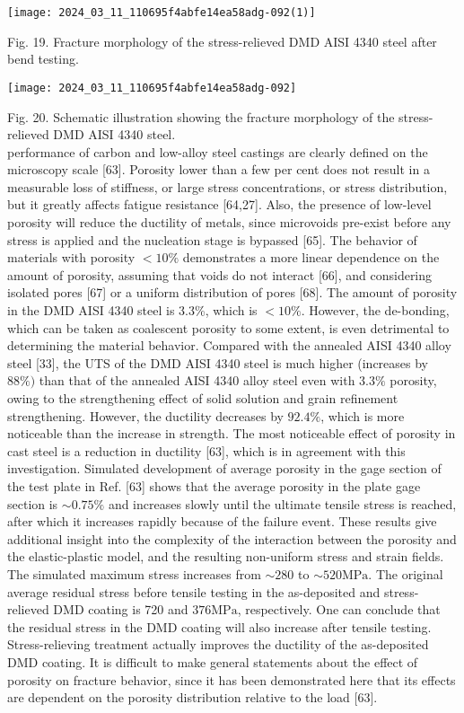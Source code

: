 \documentclass[10pt]{article}
\begin{document}
\begin{center}
\texttt{[image: 2024\_03\_11\_110695f4abfe14ea58adg-092(1)]}
\end{center}

Fig. 19. Fracture morphology of the stress-relieved DMD AISI 4340 steel after bend testing.

\begin{center}
\texttt{[image: 2024\_03\_11\_110695f4abfe14ea58adg-092]}
\end{center}

Fig. 20. Schematic illustration showing the fracture morphology of the stress-relieved DMD AISI 4340 steel.\\
performance of carbon and low-alloy steel castings are clearly defined on the microscopy scale [63]. Porosity lower than a few per cent does not result in a measurable loss of stiffness, or large stress concentrations, or stress distribution, but it greatly affects fatigue resistance [64,27]. Also, the presence of low-level porosity will reduce the ductility of metals, since microvoids pre-exist before any stress is applied and the nucleation stage is bypassed [65]. The behavior of materials with porosity $<10 \%$ demonstrates a more linear dependence on the amount of porosity, assuming that voids do not interact [66], and considering isolated pores [67] or a uniform distribution of pores [68]. The amount of porosity in the DMD AISI 4340 steel is 3.3\%, which is $<10 \%$. However, the de-bonding, which can be taken as coalescent porosity to some extent, is even detrimental to determining the material behavior. Compared with the annealed AISI 4340 alloy steel [33], the UTS of the DMD AISI 4340 steel is much higher (increases by $88 \%)$ than that of the annealed AISI 4340 alloy steel even with $3.3 \%$ porosity, owing to the strengthening effect of solid solution and grain refinement strengthening. However, the ductility decreases by $92.4 \%$, which is more noticeable than the increase in strength. The most noticeable effect of porosity in cast steel is a reduction in ductility [63], which is in agreement with this investigation. Simulated development of average porosity in the gage section of the test plate in Ref. [63] shows that the average porosity in the plate gage section is $\sim 0.75 \%$ and increases slowly until the ultimate tensile stress is reached, after which it increases rapidly because of the failure event. These results give additional insight into the complexity of the interaction between the porosity and the elastic-plastic model, and the resulting non-uniform stress and strain fields. The simulated maximum stress increases from $\sim 280$ to $\sim 520 \mathrm{MPa}$. The original average residual stress before tensile testing in the as-deposited and stress-relieved DMD coating is 720 and $376 \mathrm{MPa}$, respectively. One can conclude that the residual stress in the DMD coating will also increase after tensile testing. Stress-relieving treatment actually improves the ductility of the as-deposited DMD coating. It is difficult to make general statements about the effect of porosity on fracture behavior, since it has been demonstrated here that its effects are dependent on the porosity distribution relative to the load [63].
\end{document}
